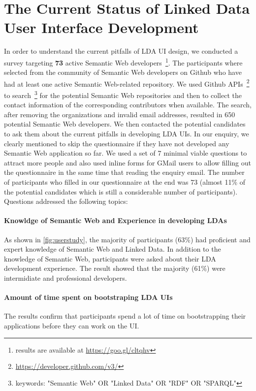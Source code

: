 \documentclass{acm_proc_article-sp}
\begin{document}
\section{The Current Status of Linked Data User Interface Development}
In order to understand the current pitfalls of LDA UI design, we conducted a survey targeting \textbf{73} active Semantic Web developers~\footnote{results are available at \url{https://goo.gl/cltqhv}}.
The participants where selected from the community of Semantic Web developers on Github who have had at least one active Semantic Web-related repository.
We used Github APIs~\footnote{\url{https://developer.github.com/v3/}} to search~\footnote{keywords: "Semantic Web" OR "Linked Data" OR "RDF" OR "SPARQL"} for the potential Semantic Web repositories and then to collect the contact information of the corresponding contributors when available.
The search, after removing the organizations and invalid email addresses, resulted in 650 potential Semantic Web developers.
We then contacted the potential candidates to ask them about the current pitfalls in developing LDA UIs.
In our enquiry, we clearly mentioned to skip the questionnaire if they have not developed any Semantic Web application so far.
We used a set of 7 minimal viable questions to attract more people and also used inline forms for GMail users to allow filling out the questionnaire in the same time that reading the enquiry email.
The number of participants who filled in our questionnaire at the end was 73 (almost 11\% of the potential candidates which is still a considerable number of participants).
Questions addressed the following topics:

\paragraph{Knowldge of Semantic Web and Experience in developing LDAs}
As shown in \autoref{fig:userstudy}, the majority of participants (63\%) had proficient and expert knowledge of Semantic Web and Linked Data.
In addition to the knowledge of Semantic Web, participants were asked about their LDA development experience.
The result showed that the majority (61\%) were intermidiate and professional developers. 

\paragraph{Amount of time spent on bootstraping LDA UIs}
 The results confirm that participants spend a lot of time on bootstrapping their applications before they can work on the UI.
 
\end{document}
